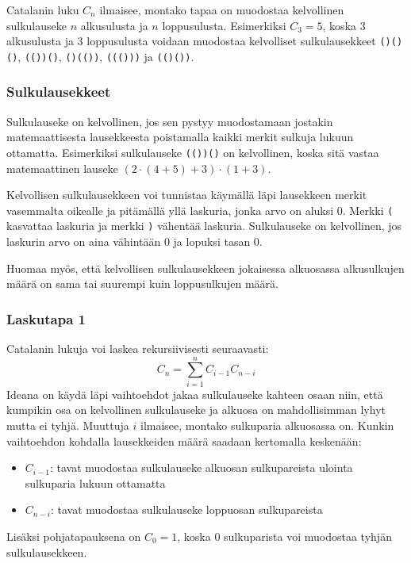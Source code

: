Catalanin luku $C_n$ ilmaisee,
montako tapaa on muodostaa kelvollinen sulkulauseke
$n$ alkusulusta ja $n$ loppusulusta.
Esimerkiksi $C_3=5$, koska 3 alkusulusta
ja 3 loppusulusta voidaan muodostaa
kelvolliset sulkulausekkeet
\texttt{()()()}, \texttt{(())()},
\texttt{()(())}, \texttt{((()))} ja \texttt{(()())}.

\subsubsection{Sulkulausekkeet}

Sulkulauseke on kelvollinen, jos sen pystyy
muodostamaan jostakin
matemaattisesta lausekkeesta poistamalla
kaikki merkit sulkuja lukuun ottamatta.
Esimerkiksi sulkulauseke \texttt{(())()}
on kelvollinen, koska sitä vastaa
matemaattinen lauseke $(2 \cdot (4+5)+3)\cdot(1+3)$.

Kelvollisen sulkulausekkeen voi tunnistaa käymällä
läpi lausekkeen merkit vasemmalta oikealle ja
pitämällä yllä laskuria, jonka arvo on aluksi 0.
Merkki \texttt{(} kasvattaa laskuria ja
merkki \texttt{)} vähentää laskuria.
Sulkulauseke on kelvollinen, jos laskurin arvo
on aina vähintään 0 ja lopuksi tasan 0.

Huomaa myös, että kelvollisen sulkulausekkeen
jokaisessa alkuosassa alkusulkujen määrä on
sama tai suurempi kuin loppusulkujen määrä.

\subsubsection{Laskutapa 1}

Catalanin lukuja voi laskea rekursiivisesti seuraavasti:
\[ C_n = \sum_{i=1}^{n} C_{i-1} C_{n-i}\]
Ideana on käydä läpi vaihtoehdot
jakaa sulkulauseke kahteen osaan niin,
että kumpikin osa on kelvollinen sulkulauseke
ja alkuosa on mahdollisimman lyhyt mutta ei tyhjä.
Muuttuja $i$ ilmaisee, montako sulkuparia
alkuosassa on.
Kunkin vaihtoehdon kohdalla lausekkeiden määrä
saadaan kertomalla keskenään:

\begin{itemize}
\item $C_{i-1}$: tavat muodostaa sulkulauseke
alkuosan sulkupareista ulointa sulkuparia lukuun ottamatta
\item $C_{n-i}$: tavat muodostaa sulkulauseke
loppuosan sulkupareista
\end{itemize}
Lisäksi pohjatapauksena on $C_0=1$, koska 0
sulkuparista voi muodostaa
tyhjän sulkulausekkeen.


